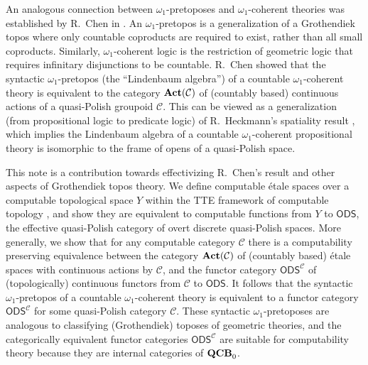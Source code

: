 \documentclass[envcountsame]{llncs}
\def\QCB{{{\bf QCB}_0}}
\def\calC{{\mathcal{C}}}
\newcommand{\cntSets}{{\mathsf{ODS}}}
\def\QCB{{{\bf QCB}_0}}
\def\act{{\mathrm{\bold{Act}}}}
\begin{document}
An analogous connection between $\omega_1$-pretoposes and $\omega_1$-coherent theories was established by R.~Chen in \cite{Chen19,Chen25}. An $\omega_1$-pretopos is a generalization of a Grothendiek topos where only countable coproducts are required to exist, rather than all small coproducts. Similarly, $\omega_1$-coherent logic is the restriction of geometric logic that requires infinitary disjunctions to be countable. R.~Chen showed that the syntactic $\omega_1$-pretopos (the ``Lindenbaum algebra'') of a countable $\omega_1$-coherent theory is equivalent to the category $\act(\calC)$ of (countably based) continuous actions of a quasi-Polish groupoid $\calC$. This can be viewed as a  generalization (from propositional logic to predicate logic) of R.~Heckmann's spatiality result \cite{H15}, which implies the Lindenbaum algebra of a countable $\omega_1$-coherent propositional theory is isomorphic to the frame of opens of a quasi-Polish space.

This note is a contribution towards effectivizing R.~Chen's result and other aspects of Grothendiek topos theory. We define computable \'{e}tale spaces over a computable topological space $Y$ within the TTE framework of computable topology \cite{W00}, and show they are equivalent to computable functions from $Y$ to $\cntSets$, the effective quasi-Polish category of overt discrete quasi-Polish spaces. More generally, we show that for any computable category $\calC$ there is a computability preserving equivalence between the category $\act(\calC)$ of (countably based) \'{e}tale spaces with continuous actions by $\calC$, and the functor category $\cntSets^\calC$ of (topologically) continuous functors from $\calC$ to $\cntSets$. It follows that the syntactic $\omega_1$-pretopos of a countable $\omega_1$-coherent theory is equivalent to a functor category $\cntSets^\calC$ for some quasi-Polish category $\calC$. These syntactic $\omega_1$-pretoposes are analogous to classifying (Grothendiek) toposes of geometric theories, and the categorically equivalent functor categories $\cntSets^\calC$ are suitable for computability theory because they are internal categories of $\QCB$.
\end{document}
